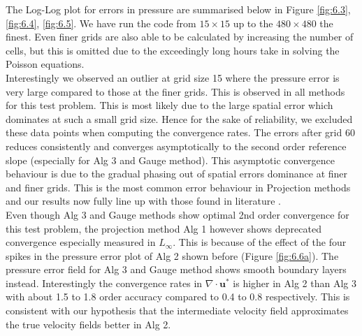 The Log-Log plot for errors in pressure are summarised below in Figure \ref{fig:6.3}, \ref{fig:6.4}, \ref{fig:6.5}. We have run the code from $15 \times 15$ up to the $480 \times 480$ the finest. Even finer grids are also able to be calculated by increasing the number of cells, but this is omitted due to the exceedingly long hours take in solving the Poisson equations.\\

Interestingly we observed an outlier at grid size 15 where the pressure error is very large compared to those at the finer grids. This is observed in all methods for this test problem. This is most likely due to the large spatial error which dominates at such a small grid size. Hence for the sake of reliability, we excluded these data points when computing the convergence rates. The errors after grid 60 reduces consistently and converges asymptotically to the second order reference slope (especially for Alg 3 and Gauge method). This asymptotic convergence behaviour is due to the gradual phasing out of spatial errors dominance at finer and finer grids. This is the most common error behaviour in Projection methods and our results now fully line up with those found in literature \cite{guermond2004error}. \\

Even though Alg 3 and Gauge methods show optimal 2nd order convergence for this test problem, the projection method Alg 1 however shows deprecated convergence especially measured in $L_\infty$. This is because of the effect of the four spikes in the pressure error plot of Alg 2 shown before (Figure \ref{fig:6.6a}). The pressure error field for Alg 3 and Gauge method shows smooth boundary layers instead. Interestingly the convergence rates in $\nabla \cdot \textbf{u}^*$ is higher in Alg 2 than Alg 3 with about 1.5 to 1.8 order accuracy compared to 0.4 to 0.8 respectively. This is consistent with our hypothesis that the intermediate velocity field approximates the true velocity fields better in Alg 2. \\

